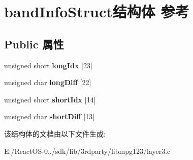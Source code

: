 \hypertarget{structband_info_struct}{}\section{band\+Info\+Struct结构体 参考}
\label{structband_info_struct}
\subsection*{Public 属性}
\begin{DoxyCompactItemize}
\item 
\mbox{\label{structband_info_struct_af6515d6f52f8425112d8dee5be1ddd5d}} 
unsigned short {\bfseries long\+Idx} \mbox{[}23\mbox{]}
\item 
\mbox{\label{structband_info_struct_a410f4140171932e0dffac92fc80d6303}} 
unsigned char {\bfseries long\+Diff} \mbox{[}22\mbox{]}
\item 
\mbox{\label{structband_info_struct_abc6536305f86876b9ccce2a72fa318a6}} 
unsigned short {\bfseries short\+Idx} \mbox{[}14\mbox{]}
\item 
\mbox{\label{structband_info_struct_ade085c8f56b143208dcf5f147480a731}} 
unsigned char {\bfseries short\+Diff} \mbox{[}13\mbox{]}
\end{DoxyCompactItemize}


该结构体的文档由以下文件生成\+:\begin{DoxyCompactItemize}
\item 
E\+:/\+React\+O\+S-\/0../sdk/lib/3rdparty/libmpg123/layer3.\+c\end{DoxyCompactItemize}
